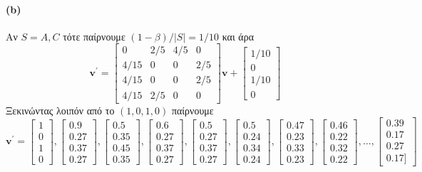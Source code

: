 \documentclass[a4paper,11pt]{article}
\begin{document}
\paragraph{(b)} Αν $S={A,C}$ τότε παίρνουμε $(1-\beta)/|S|=1/10$ και άρα
\[
	\textbf{v}^\prime =
	\begin{bmatrix}
		0 & 2/5 & 4/5 & 0 \\
		4/15 & 0 & 0 & 2/5 \\
		4/15 & 0 & 0 & 2/5 \\
		4/15 & 2/5 & 0 & 0
	\end{bmatrix}
	\textbf{v} +
	\begin{bmatrix}
	1/10 \\ 0 \\ 1/10 \\ 0
	\end{bmatrix}
\]
Ξεκινώντας λοιπόν από το $(1,0,1,0)$ παίρνουμε
\[
	\textbf{v}^\prime=
	\begin{bmatrix}1 \\ 0 \\ 1 \\ 0\end{bmatrix},
	\begin{bmatrix}0.9 \\ 0.27 \\ 0.37 \\ 0.27\end{bmatrix},
	\begin{bmatrix}0.5 \\ 0.35 \\ 0.45 \\ 0.35\end{bmatrix},
	\begin{bmatrix}0.6 \\ 0.27 \\ 0.37 \\ 0.27\end{bmatrix},
	\begin{bmatrix}0.5 \\ 0.27 \\ 0.37 \\ 0.27\end{bmatrix},
	\begin{bmatrix}0.5 \\ 0.24 \\ 0.34 \\ 0.24\end{bmatrix},
	\begin{bmatrix}0.47 \\ 0.23 \\ 0.33 \\ 0.23\end{bmatrix},
	\begin{bmatrix}0.46 \\ 0.22 \\ 0.32 \\ 0.22\end{bmatrix},
	\dots,
	\begin{bmatrix}0.39 \\ 0.17 \\ 0.27 \\ 0.17]\end{bmatrix}
\]
\end{document}
